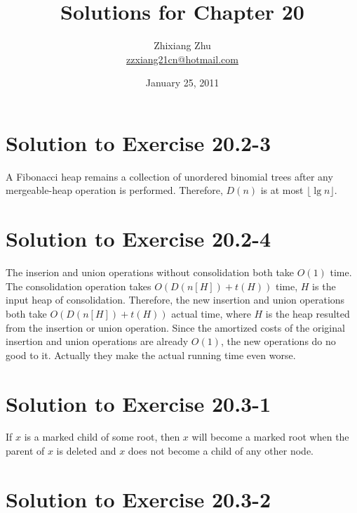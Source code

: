 \documentclass[a4paper, fleqn]{article}
\title{Solutions for Chapter 20}
\author{Zhixiang Zhu
\\\href{mailto:zzxiang21cn@hotmail.com}{zzxiang21cn@hotmail.com}}
\date{January 25, 2011}
\begin{document}
\maketitle

\section*{Solution to Exercise 20.2-3}

A Fibonacci heap remains a collection of unordered binomial trees
after any mergeable-heap operation is performed. Therefore, $D(n)$ is
at most $\lfloor \lg n \rfloor$.





\section*{Solution to Exercise 20.2-4}

The inserion and union operations without consolidation both take
$O(1)$ time. The consolidation operation takes $O(D(n[H]) + t(H))$
time, $H$ is the input heap of consolidation. Therefore, the new
insertion and union operations both take $O(D(n[H]) + t(H))$ actual
time, where $H$ is the heap resulted from the insertion or union
operation. Since the amortized costs of the original insertion and
union operations are already $O(1)$, the new operations do no good to
it. Actually they make the actual running time even worse.






\section*{Solution to Exercise 20.3-1}

If $x$ is a marked child of some root, then $x$ will become a marked
root when the parent of $x$ is deleted and $x$ does not become a child
of any other node.






\section*{Solution to Exercise 20.3-2}
\end{document}
